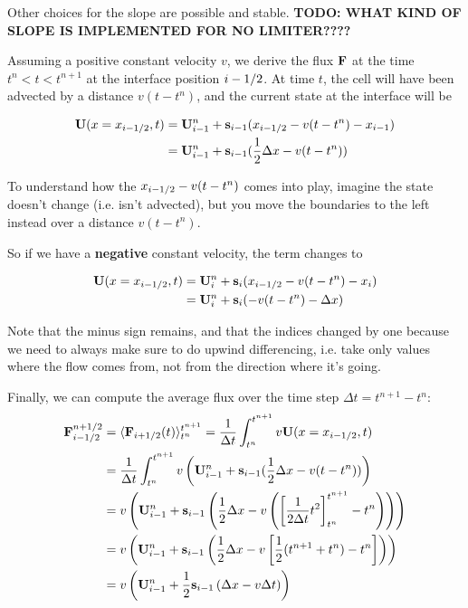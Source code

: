 Other choices for the slope are possible and stable.
\textbf{TODO: WHAT KIND OF SLOPE IS IMPLEMENTED FOR NO LIMITER????}



Assuming a positive constant velocity $v$, we derive the flux $\mathbf{F}$ at the time $t^n < t < t^{n+1}$ at the interface position $i-1/2$.
At time $t$, the cell will have been advected by a distance $v (t - t^n)$, and the current state at the interface will be

\begin{align*}
	\mathbf{U}(x=x_{i-1/2}, t) 
		&= \mathbf{U}_{i-1}^n + \mathbf{s}_{i-1} (x_{i-1/2} - v (t - t^n) - x_{i-1}) \\
		&= \mathbf{U}_{i-1}^n + \mathbf{s}_{i-1} (\frac{1}{2} \Delta x - v (t - t^n))
\end{align*}

To understand how the $x_{i-1/2} - v (t - t^n)$ comes into play, imagine the state doesn't change (i.e. isn't advected), but you move the boundaries to the left instead over a distance $v(t - t^n)$.

So if we have a \textbf{negative} constant velocity, the term changes to 

\begin{align*}
	\mathbf{U}(x=x_{i-1/2}, t) 
		&= \mathbf{U}_{i}^n + \mathbf{s}_{i} (x_{i-1/2} - v (t - t^n) - x_{i}) \\
		&= \mathbf{U}_{i}^n + \mathbf{s}_{i} (-v (t - t^n) - \Delta x)
\end{align*}



Note that the minus sign remains, and that the indices changed by one because we need to always make sure to do upwind differencing, i.e. take only values where the flow comes from, not from the direction where it's going.

Finally, we can compute the average flux over the time step $\Delta t = t^{n+1} - t^{n}$:
\begin{align}
	\mathbf{F}_{i-1/2}^{n+1/2} 
	&= \langle \mathbf{F}_{i+1/2}(t)\rangle _{t^n} ^ {t^{n+1}} 
	= \frac{1}{\Delta t} \int_{t^n}^{t^{n+1}} v \mathbf{U}(x 
	= x_{i-1/2}, t) \\
	&= \frac{1}{\Delta t} \int_{t^n}^{t^{n+1}} v \left( \mathbf{U}_{i-1}^n + \mathbf{s}_{i-1} (\frac{1}{2} \Delta x - v (t - t^n)) \right) \\
	&= v \left( \mathbf{U}_{i-1}^n  + \mathbf{s}_{i-1} \left( \frac{1}{2} \Delta x - v \left( \left[ \frac{1}{2 \Delta t} t^2 \right]_{t^n}^{t^{n+1}} - t^n \right)  \right) \right) \\
	&= v \left( \mathbf{U}_{i-1}^n  + \mathbf{s}_{i-1} \left( \frac{1}{2} \Delta x - v \left[ \frac{1}{2} (t^{n+1} + t^n) - t^n \right] \right) \right) \\
	&= v \left( \mathbf{U}_{i-1}^n  + \frac{1}{2} \mathbf{s}_{i-1} \left(\Delta x - v \Delta t \right) \right)
\end{align}



